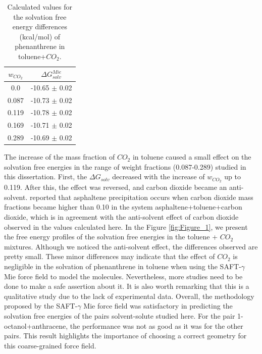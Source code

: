 \FloatBarrier
\begin{table}[H]
	\centering
	\caption{Calculated values for the solvation free energy differences (kcal/mol) of phenanthrene in toluene+$CO_{2}$.}
	\label{tbl:solvco2}
	\begin{tabular}{cc}
		\hline
		\hline
		$w_{CO_{2}}$ & $\Delta G_{solv}^{Mie}$ \\
		\hline\hline
		0.0    & -10.65 $\pm$ 0.02   \\
		0.087  & -10.73 $\pm$ 0.02   \\
		0.119  & -10.78 $\pm$ 0.02   \\
		0.169  & -10.71 $\pm$ 0.02   \\
		0.289  & -10.69 $\pm$ 0.02   \\
		\hline
		\hline
	\end{tabular}
\end{table}
\FloatBarrier

The increase of the mass fraction of $CO_{2}$ in toluene caused a small effect on the solvation free energies in the range of weight fractions (0.087-0.289) studied in this dissertation. First, the $\Delta G_{solv}$ decreased with the increase of $w_{CO_{2}}$ up to 0.119. After this, the effect was reversed, and carbon dioxide became an anti-solvent.  reported that asphaltene precipitation occurs when carbon dioxide mass fractions became higher than 0.10 in the system asphaltene+toluene+carbon dioxide, which is in agreement with the anti-solvent effect of carbon dioxide observed in the values calculated here. In the Figure \ref{fig:Figure_1}, we present the free energy profiles of the solvation free energies in the toluene + $CO_{2}$ mixtures. Although we noticed the anti-solvent effect, the differences observed are pretty small. These minor differences may indicate that the effect of $CO_{2}$ is negligible in the solvation of phenanthrene in toluene when using the SAFT-$\gamma$ Mie force field to model the molecules. Nevertheless, more studies need to be done to make a safe assertion about it. It is also worth remarking that this is a qualitative study due to the lack of experimental data. Overall, the methodology proposed by the SAFT-$\gamma$ Mie force field was satisfactory in predicting the solvation free energies of the pairs solvent-solute studied here. For the pair 1-octanol+anthracene, the performance was not as good as it was for the other pairs. This result highlights the importance of choosing a correct geometry for this coarse-grained force field.    

